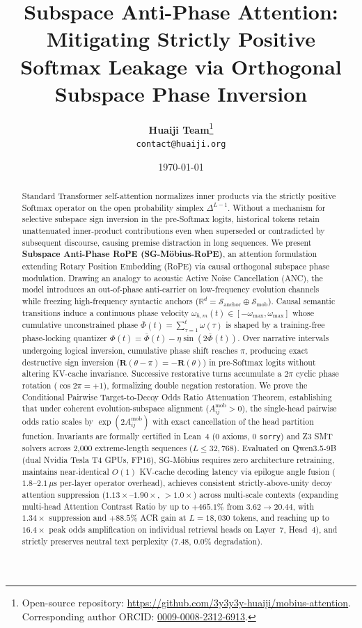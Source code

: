 \documentclass[11pt,a4paper]{article}
\title{\textbf{Subspace Anti-Phase Attention: Mitigating Strictly Positive Softmax Leakage via Orthogonal Subspace Phase Inversion}}
\author{
  \textbf{Huaiji Team}\thanks{Open-source repository: \url{https://github.com/3y3y3y-huaiji/mobius-attention}. Corresponding author ORCID: \href{https://orcid.org/0009-0008-2312-6913}{0009-0008-2312-6913}.} \\
  \texttt{contact@huaiji.org}
}
\date{\today}
\theoremstyle{definition}
\begin{document}
\maketitle

\begin{abstract}
Standard Transformer self-attention normalizes inner products via the strictly positive Softmax operator on the open probability simplex $\Delta^{L-1}$. Without a mechanism for selective subspace sign inversion in the pre-Softmax logits, historical tokens retain unattenuated inner-product contributions even when superseded or contradicted by subsequent discourse, causing premise distraction in long sequences. We present \textbf{Subspace Anti-Phase RoPE (SG-M\"obius-RoPE)}, an attention formulation extending Rotary Position Embedding (RoPE) via causal orthogonal subspace phase modulation. Drawing an analogy to acoustic Active Noise Cancellation (ANC), the model introduces an out-of-phase anti-carrier on low-frequency evolution channels while freezing high-frequency syntactic anchors ($\mathbb{R}^d = \mathcal{S}_{\text{anchor}} \oplus \mathcal{S}_{\text{mob}}$). Causal semantic transitions induce a continuous phase velocity $\omega_{h,m}(t) \in [-\omega_{\max}, \omega_{\max}]$ whose cumulative unconstrained phase $\bar{\Phi}(t) = \sum_{\tau=1}^t \omega(\tau)$ is shaped by a training-free phase-locking quantizer $\Phi(t) = \bar{\Phi}(t) - \eta\sin(2\bar{\Phi}(t))$. Over narrative intervals undergoing logical inversion, cumulative phase shift reaches $\pi$, producing exact destructive sign inversion ($\mathbf{R}(\theta - \pi) = -\mathbf{R}(\theta)$) in pre-Softmax logits without altering KV-cache invariance. Successive restorative turns accumulate a $2\pi$ cyclic phase rotation ($\cos 2\pi = +1$), formalizing double negation restoration. We prove the Conditional Pairwise Target-to-Decoy Odds Ratio Attenuation Theorem, establishing that under coherent evolution-subspace alignment ($A_{ij}^{\text{mob}} > 0$), the single-head pairwise odds ratio scales by $\exp(2A_{ij}^{\text{mob}})$ with exact cancellation of the head partition function. Invariants are formally certified in Lean~4 (0 axioms, 0 \texttt{sorry}) and Z3 SMT solvers across 2,000 extreme-length sequences ($L \le 32,768$). Evaluated on Qwen3.5-9B (dual Nvidia Tesla T4 GPUs, FP16), SG-M\"obius requires zero architecture retraining, maintains near-identical $O(1)$ KV-cache decoding latency via epilogue angle fusion ($1.8\text{--}2.1\,\mu\text{s}$ per-layer operator overhead), achieves consistent strictly-above-unity decoy attention suppression ($1.13\times\text{--}1.90\times$, $> 1.0\times$) across multi-scale contexts (expanding multi-head Attention Contrast Ratio by up to $+465.1\%$ from $3.62 \to 20.44$, with $1.34\times$ suppression and $+88.5\%$ ACR gain at $L=18,030$ tokens, and reaching up to $16.4\times$ peak odds amplification on individual retrieval heads on Layer~7, Head~4), and strictly preserves neutral text perplexity ($7.48$, $0.0\%$ degradation).
\end{abstract}
\end{document}
